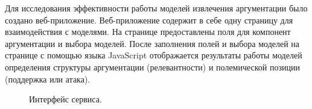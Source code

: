 Для исследования эффективности работы моделей извлечения аргументации было создано веб-приложение. Веб-приложение содержит в себе одну страницу для взаимодействия с моделями. На странице предоставлены поля для компонент аргументации и выбора моделей. После заполнения полей и выбора моделей на странице с помощью языка JavaScript отображается результаты работы моделей определения структуры аргументации (релевантности) и полемической позиции (поддержка или атака).

\begin{figure}[H]
 \caption{Интерфейс сервиса.}
\end{figure}



